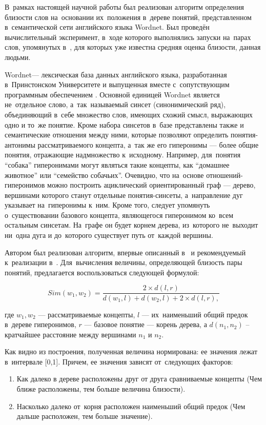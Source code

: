 В~рамках настоящей научной работы был реализован алгоритм определения близости слов
на~основании их~положения в~дереве понятий, представленном в~семантической сети
английского языка Wordnet\cite{wordnet}.
Был проведён вычислительный эксперимент, в~ходе которого выполнялись запуски на~парах слов, упомянутых в~\cite{complexSim},
для которых уже известна средняя оценка близости, данная людьми.

Wordnet--- лексическая база данных английского языка,
разработанная в~Принстонском Университете и выпущенная вместе с~сопутствующим программным обеспечением \cite{wordnet}.
Основной единицей Wordnet является не~отдельное слово, 
а~так~называемый синсет (синонимический ряд),
объединяющий в~себе множество слов, имеющих схожий смысл, выражающих одно и то~же понятие.
Кроме набора синсетов в~базе представлены также и семантические отношения между ними,
которые позволяют определить понятия-антонимы рассматриваемого концепта,
а~так же его гиперонимы --- более общие понятия, отражающие надмножество к~исходному.
Например, для~понятия ``собака'' гиперонимами могут являться такие концепты,
как ``домашнее животное'' или ``семейство собачьих''.
Очевидно, что на~основе отношений-гиперонимов можно построить ациклический ориентированный граф --- 
дерево, вершинами которого станут отдельные понятия-синсеты, 
а~направление дуг указывает на~гиперонимы к~ним.
Кроме того, следует упомянуть о~существовании базового концепта, 
являющегося гиперонимом ко~всем остальным синсетам. 
На~графе он будет корнем дерева,
из~которого не~выходит ни~одна дуга и до~которого существует путь от~каждой вершины.

Автором был реализован алгоритм, впервые описанный  в~
\cite{inproceedings} и 
рекомендуемый к~реализации в~\cite{complexSim}.
Для~вычисления величины, определяющей близость пары понятий, 
предлагается воспользоваться следующей формулой:

$$ Sim(w_1, w_2) = \frac{ 2\times d(l, r) }
	               { d(w_1, l) + d(w_2, l) + 2\times d(l,r), }$$

где $w_1,w_2$ --- рассматриваемые концепты, 
$l$ --- их~наименьший общий предок в~дереве гиперонимов,
$r$ --- базовое понятие --- корень дерева, 
а $d(n_1,n_2)$ -- 
кратчайшее расстояние между вершинами $n_1$ и $n_2$.

Как видно из построения, полученная величина нормирована: ее значения лежат в~интервале [0,1].
Причем, ее значения зависят от~следующих факторов:

\begin{enumerate}

\item{
Как далеко в дереве расположены друг от друга сравниваемые концепты (Чем ближе расположены, тем больше величина близости).
}

\item{
Насколько далеко от~корня расположен наименьший общий предок   (Чем дальше расположен, тем больше значение).
}

\end{enumerate}

